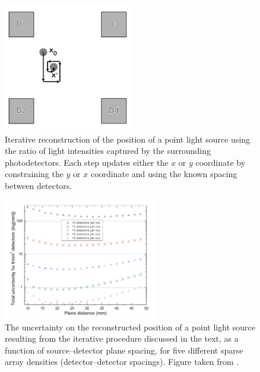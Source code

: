 \begin{figure}
\centering
\includegraphics[width=0.5\textwidth]{chapters/detectorphysics_images/Iterative-Source-Recon}
\caption[Iterative point light source position reconstruction]{\label{fig:iterative-source-recon}Iterative reconstruction of the position of a point light source using the ratio of light intensities captured by the surrounding photodetectors. Each step updates either the $x$ or $y$ coordinate by constraining the $y$ or $x$ coordinate and using the known spacing between detectors.}
\end{figure}

\begin{figure}
\centering
\includegraphics[width=0.6\textwidth]{chapters/detectorphysics_images/detector-spacing}
\caption[Uncertainty on position resolution for several sparse array detector densities]{\label{fig:detector-spacing}The uncertainty on the reconstructed position of a point light source resulting from the iterative procedure discussed in the text, as a function of source--detector plane spacing, for five different sparse array densities (detector--detector spacings). Figure taken from \citep{Rutter2011}.}
\end{figure}


